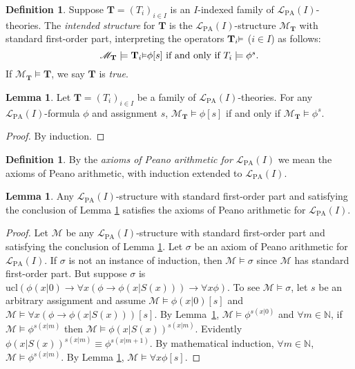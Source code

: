 \documentclass[reqno]{article}
\theoremstyle{definition}
\newtheorem{lemma}[theorem]{Lemma}
\newtheorem{definition}[theorem]{Definition}
\def\N{\mathbb{N}}
\def\L{\mathscr{L}}
\def\M{\mathscr{M}}
\def\T{\mathbf{T}}
\def\LPA{\L_{\mathrm{PA}}}
\renewcommand{\Pr}[1]{\T_{#1}\mbox{\small${\vDash}$}}
\newcommand{\ucl}[1]{\mathrm{ucl}(#1)}
\begin{document}
\begin{definition}
\label{intendedstructdefn}
Suppose $\T=(T_i)_{i\in I}$ is an $I$-indexed family of 
$\LPA(I)$-theories.
The \emph{intended structure} for $\T$ is the $\LPA(I)$-structure $\M_\T$
with standard first-order part,
interpreting the operators $\Pr{i}$ ($i\in I$) as follows:
\[
\mbox{$\M_\T\models\Pr{i}\phi[s]$ if and only if $T_i\models\phi^s$.}
\]
If $\M_\T\models\T$, we say $\T$ is \emph{true}.
\end{definition}

\begin{lemma}
\label{howintendedworks}
Let $\T=(T_i)_{i\in I}$ be a family of $\LPA(I)$-theories.
For any $\LPA(I)$-formula $\phi$ and assignment $s$,
$\M_\T\models\phi[s]$ if and only if $\M_\T\models\phi^s$.
\end{lemma}

\begin{proof}
By induction.
\end{proof}

\begin{definition}
By the \emph{axioms of Peano arithmetic for $\LPA(I)$} we mean the axioms of Peano arithmetic,
with induction extended to $\LPA(I)$.
\end{definition}

\begin{lemma}
\label{extendedpalemma}
%
%
Any $\LPA(I)$-structure
with standard first-order part and satisfying the conclusion of Lemma \ref{howintendedworks}
satisfies the axioms of Peano arithmetic for $\LPA(I)$.
\end{lemma}

\begin{proof}
Let $\M$ be any $\LPA(I)$-structure
with standard first-order part and satisfying the conclusion of Lemma \ref{howintendedworks}.
Let $\sigma$ be an axiom of Peano arithmetic for $\LPA(I)$.  If $\sigma$ is not an instance
of induction, then $\M\models\sigma$ since $\M$ has standard first-order part.
But suppose $\sigma$ is $\ucl{\phi(x|0)\rightarrow \forall x(\phi\rightarrow\phi(x|S(x)))\rightarrow\forall x\phi}$.
To see $\M\models\sigma$, let $s$ be an arbitrary assignment and assume
$\M\models\phi(x|0)[s]$ and $\M\models\forall x(\phi\rightarrow \phi(x|S(x)))[s]$.
By Lemma~\ref{howintendedworks}, $\M\models\phi^{s(x|0)}$ and $\forall m\in\N$,
if $\M\models \phi^{s(x|m)}$ then $\M\models \phi(x|S(x))^{s(x|m)}$.
Evidently $\phi(x|S(x))^{s(x|m)}\equiv\phi^{s(x|m+1)}$.
%
%
By mathematical induction, $\forall m\in\N$, $\M\models\phi^{s(x|m)}$.
By Lemma \ref{howintendedworks}, $\M\models \forall x\phi[s]$.
\end{proof}
\end{document}

